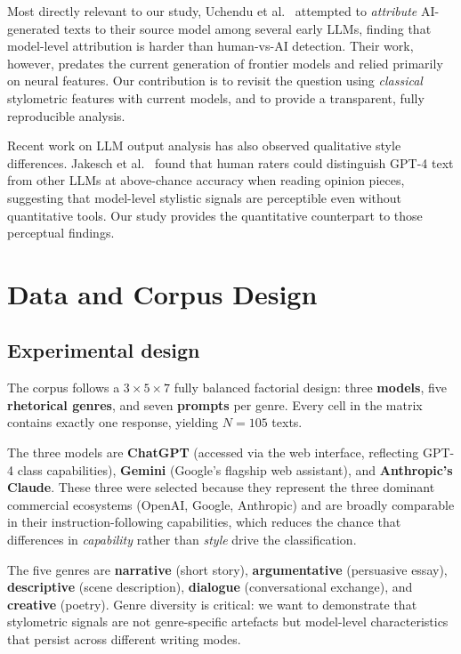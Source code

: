 \documentclass[11pt,a4paper]{article}
\begin{document}
Most directly relevant to our study, Uchendu et al.~\cite{uchendu}
attempted to \emph{attribute} AI-generated texts to their source
model among several early LLMs, finding that model-level attribution
is harder than human-vs-AI detection. Their work, however, predates
the current generation of frontier models and relied primarily on
neural features. Our contribution is to revisit the question using
\emph{classical} stylometric features with current models, and to
provide a transparent, fully reproducible analysis.

Recent work on LLM output analysis has also observed qualitative
style differences. Jakesch et al.~\cite{jakesch} found that human
raters could distinguish GPT-4 text from other LLMs at above-chance
accuracy when reading opinion pieces, suggesting that model-level
stylistic signals are perceptible even without quantitative tools.
Our study provides the quantitative counterpart to those perceptual
findings.

\section{Data and Corpus Design}
\label{sec:data}

\subsection{Experimental design}

The corpus follows a $3 \times 5 \times 7$ fully balanced factorial
design: three \textbf{models}, five \textbf{rhetorical genres}, and
seven \textbf{prompts} per genre. Every cell in the matrix contains
exactly one response, yielding $N = 105$ texts.

The three models are \textbf{ChatGPT} (accessed via the web interface,
reflecting GPT-4 class capabilities), \textbf{Gemini} (Google's
flagship web assistant), and \textbf{Anthropic's Claude}. These three
were selected because they represent the three dominant commercial
ecosystems (OpenAI, Google, Anthropic) and are broadly comparable in
their instruction-following capabilities, which reduces the chance
that differences in \emph{capability} rather than \emph{style} drive
the classification.

The five genres are \textbf{narrative} (short story), \textbf{argumentative}
(persuasive essay), \textbf{descriptive} (scene description),
\textbf{dialogue} (conversational exchange), and \textbf{creative}
(poetry). Genre diversity is critical: we want to demonstrate that
stylometric signals are not genre-specific artefacts but
model-level characteristics that persist across different writing
modes.
\end{document}
